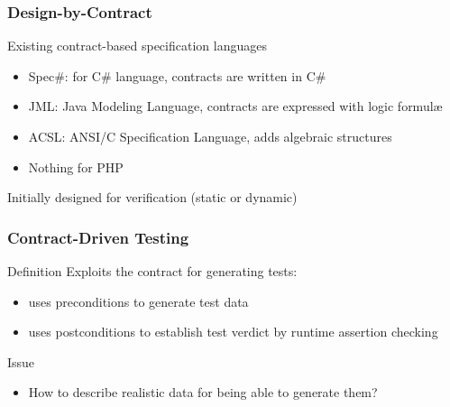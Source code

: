 \documentclass[10pt]{beamer}
\begin{document}
\begin{frame}
\frametitle{Design-by-Contract}

\begin{block}{Existing contract-based specification languages}
\begin{itemize}
\item Spec\#: for C\# language, contracts are written in C\#
\item JML: Java Modeling Language, contracts are expressed with logic formulæ
\item ACSL: ANSI/C Specification Language, adds algebraic structures
\item Nothing for PHP
\end{itemize}
\end{block}
Initially designed for verification (static or dynamic)

\end{frame}

\begin{frame}
\frametitle{Contract-Driven Testing}

\begin{block}{Definition}
Exploits the contract for generating tests:
\begin{itemize}
\item uses preconditions to generate test data
\item uses postconditions to establish test verdict by runtime assertion
checking
\end{itemize}
\end{block}

\begin{block}{Issue}
\begin{itemize}
\item How to describe realistic data for being able to generate them?
\end{itemize}
\end{block}

\end{frame}
\end{document}
